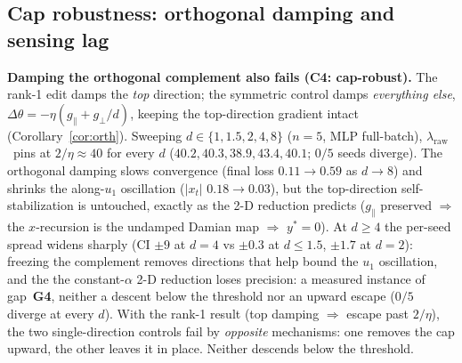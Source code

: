 \documentclass{article}
\theoremstyle{plain}
\theoremstyle{definition}
\theoremstyle{remark}
\newcommand{\lraw}{\ensuremath{\lambda_{\mathrm{raw}}}}
\begin{document}
\subsection{Cap robustness: orthogonal damping and sensing lag}
\label{sub:caprobust}
\textbf{Damping the orthogonal complement also fails (C4: cap-robust).}
The rank-1 edit damps the \emph{top} direction; the symmetric control damps
\emph{everything else}, $\Delta\theta=-\eta(g_{\parallel}+g_{\perp}/d)$, keeping
the top-direction gradient intact (Corollary~\ref{cor:orth}). Sweeping
$d\in\{1,1.5,2,4,8\}$ ($n{=}5$, MLP full-batch), \lraw\ pins at $2/\eta\approx40$
for every $d$ ($40.2,40.3,38.9,43.4,40.1$; $0/5$ seeds diverge). The orthogonal
damping slows convergence (final loss $0.11\!\to\!0.59$ as $d\!\to\!8$) and
shrinks the along-$u_{1}$ oscillation ($|x_{t}|$ $0.18\!\to\!0.03$), but the
top-direction self-stabilization is untouched, exactly as the 2-D reduction
predicts ($g_{\parallel}$ preserved $\Rightarrow$ the $x$-recursion is the
undamped Damian map $\Rightarrow$ $y^{*}=0$). At $d\ge4$ the per-seed spread
widens sharply (CI $\pm9$ at $d{=}4$ vs $\pm0.3$ at $d\le1.5$, $\pm1.7$ at
$d{=}2$): freezing the
complement removes directions that help bound the $u_{1}$ oscillation, and the
the constant-$\alpha$ 2-D reduction loses precision: a measured instance of
gap~\textbf{G4}, neither a descent below the threshold nor an upward escape ($0/5$ diverge at every $d$). With
the rank-1 result (top damping
$\Rightarrow$ escape past $2/\eta$), the two single-direction controls fail
by \emph{opposite} mechanisms: one removes the cap upward, the other leaves it in
place. Neither descends below the threshold.
\end{document}
